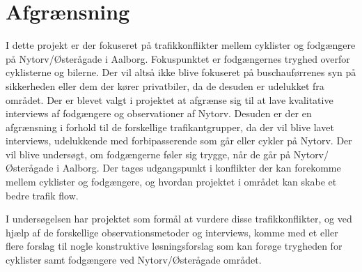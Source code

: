 \section{Afgrænsning}
\label{sec:afgraensning}

I dette projekt er der fokuseret på trafikkonflikter mellem cyklister og fodgængere på Nytorv/Østerågade i Aalborg. Fokuspunktet er fodgængernes tryghed overfor cyklisterne og bilerne. Der vil altså ikke blive fokuseret på buschauførrenes syn på sikkerheden eller dem der kører privatbiler, da de desuden er udelukket fra området. Der er blevet valgt i projektet at afgrænse sig til at lave kvalitative interviews af fodgængere og observationer af Nytorv. Desuden er der en afgrænsning i forhold til de forskellige trafikantgrupper, da der vil blive lavet interviews, udelukkende med forbipasserende som går eller cykler på Nytorv. Der vil blive undersøgt, om fodgængerne føler sig trygge, når de går på Nytorv/Østerågade i Aalborg. Der tages udgangspunkt i konflikter der kan forekomme mellem cyklister og fodgængere, og hvordan projektet i området kan skabe et bedre trafik flow.

I undersøgelsen har projektet som formål at vurdere disse trafikkonflikter, og ved hjælp af de forskellige observationsmetoder og interviews, komme med et eller flere forslag til nogle konstruktive løsningsforslag som kan forøge trygheden for cyklister samt fodgængere ved Nytorv/Østerågade området.
